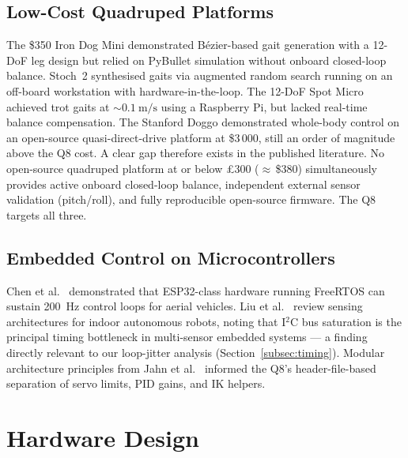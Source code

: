 \documentclass[journal]{IEEEtran}
\begin{document}
\subsection{Low-Cost Quadruped Platforms}
The \$350 Iron Dog Mini \cite{rahman2023irondogmini} demonstrated
Bézier-based gait generation with a 12-DoF leg design but relied
on PyBullet simulation without onboard closed-loop balance.
Stoch~2 \cite{tirumala2019gait} synthesised gaits via augmented
random search running on an off-board workstation with
hardware-in-the-loop.
The 12-DoF Spot Micro \cite{spotmicro2020} achieved trot gaits
at $\sim\SI{0.1}{\metre\per\second}$ using a Raspberry Pi,
but lacked real-time balance compensation.
The Stanford Doggo \cite{kau2019stanford} demonstrated
whole-body control on an open-source quasi-direct-drive
platform at \$3\,000, still an order of magnitude above
the Q8 cost.
A clear gap therefore exists in the published literature.
No open-source quadruped platform at or below \pounds300
(${\approx}$\,\$380) simultaneously provides active onboard
closed-loop balance, independent external sensor validation
(pitch/roll), and fully reproducible open-source firmware.
The Q8 targets all three.
\subsection{Embedded Control on Microcontrollers}
Chen et al.\ \cite{chen2021embedded} demonstrated that
ESP32-class hardware running FreeRTOS can sustain \SI{200}{\hertz}
control loops for aerial vehicles.
Liu et al.\ \cite{liu2024sensing} review sensing architectures
for indoor autonomous robots, noting that I$^2$C bus saturation
is the principal timing bottleneck in multi-sensor embedded
systems --- a finding directly relevant to our loop-jitter
analysis (Section~\ref{subsec:timing}).
Modular architecture principles from Jahn et al.\
\cite{jahn2019modular} informed the Q8's header-file-based
separation of servo limits, PID gains, and IK helpers.
\section{Hardware Design}
\label{sec:hw}
\end{document}
